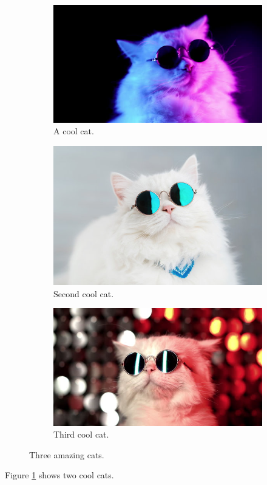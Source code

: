 \documentclass{article}
\begin{document}
\begin{figure}[h!]
\begin{subfigure}[b]{0.3\linewidth}
	\includegraphics[width=\linewidth]{cool_cat.jpg}
	\caption{A cool cat.}
\end{subfigure}
\begin{subfigure}[b]{0.3\linewidth}
	\includegraphics[width=\linewidth]{another_cool_cat.jpg}
	\caption{Second cool cat.}
\end{subfigure}
\begin{subfigure}[b]{0.3\linewidth}
	\includegraphics[width=\linewidth]{third_cool_cat.jpg}
	\caption{Third cool cat.}
\end{subfigure}
\caption{Three amazing cats.}
\label{fig:three_cats}
\end{figure}

Figure \ref{fig:three_cats} shows two cool cats.
\end{document}
